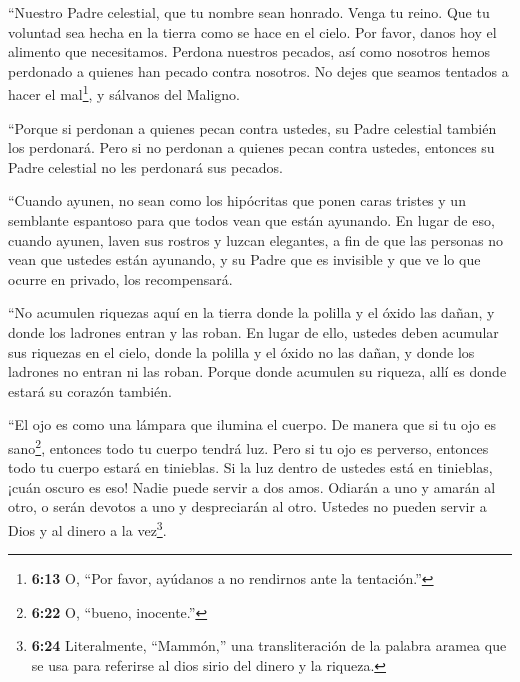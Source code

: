 ``Nuestro Padre celestial, que tu nombre sean honrado. 
Venga tu reino. Que tu voluntad sea hecha en la tierra como se hace en
el cielo.  Por favor, danos hoy el alimento que
necesitamos.  Perdona nuestros pecados, así como nosotros
hemos perdonado a quienes han pecado contra nosotros.  No
dejes que seamos tentados a hacer el mal\footnote{\textbf{6:13} O, ``Por
  favor, ayúdanos a no rendirnos ante la tentación.''}, y sálvanos del
Maligno.

 ``Porque si perdonan a quienes pecan contra ustedes, su
Padre celestial también los perdonará.  Pero si no perdonan
a quienes pecan contra ustedes, entonces su Padre celestial no les
perdonará sus pecados.

 ``Cuando ayunen, no sean como los hipócritas que ponen
caras tristes y un semblante espantoso para que todos vean que están
ayunando.  En lugar de eso, cuando ayunen, laven sus
rostros y luzcan elegantes,  a fin de que las personas no
vean que ustedes están ayunando, y su Padre que es invisible y que ve lo
que ocurre en privado, los recompensará.

 ``No acumulen riquezas aquí en la tierra donde la polilla
y el óxido las dañan, y donde los ladrones entran y las roban.
 En lugar de ello, ustedes deben acumular sus riquezas en
el cielo, donde la polilla y el óxido no las dañan, y donde los ladrones
no entran ni las roban.  Porque donde acumulen su riqueza,
allí es donde estará su corazón también.

 ``El ojo es como una lámpara que ilumina el cuerpo. De
manera que si tu ojo es sano\footnote{\textbf{6:22} O, ``bueno,
  inocente.''}, entonces todo tu cuerpo tendrá luz.  Pero
si tu ojo es perverso, entonces todo tu cuerpo estará en tinieblas. Si
la luz dentro de ustedes está en tinieblas, ¡cuán oscuro es eso!
 Nadie puede servir a dos amos. Odiarán a uno y amarán al
otro, o serán devotos a uno y despreciarán al otro. Ustedes no pueden
servir a Dios y al dinero a la vez\footnote{\textbf{6:24} Literalmente,
  ``Mammón,'' una transliteración de la palabra aramea que se usa para
  referirse al dios sirio del dinero y la riqueza.}.


